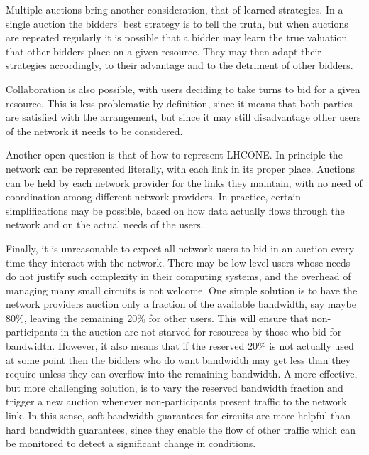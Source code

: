 Multiple auctions bring another consideration, that of learned strategies. In a single auction the bidders' best strategy is to tell the truth, but when auctions are repeated regularly it is possible that a bidder may learn the true valuation that other bidders place on a given resource. They may then adapt their strategies accordingly, to their advantage and to the detriment of other bidders. 

Collaboration is also possible, with users deciding to take turns to bid for a given resource. This is less problematic by definition, since it means that both parties are satisfied with the arrangement, but since it may still disadvantage other users of the network it needs to be considered.

Another open question is that of how to represent LHCONE. In principle the network can be represented literally, with each link in its proper place. Auctions can be held by each network provider for the links they maintain, with no need of coordination among different network providers. In practice, certain simplifications may be possible, based on how data actually flows through the network and on the actual needs of the users.

Finally, it is unreasonable to expect all network users to bid in an auction every time they interact with the network. There may be low-level users whose needs do not justify such complexity in their computing systems, and the overhead of managing many small circuits is not welcome. One simple solution is to have the network providers auction only a fraction of the available bandwidth, say maybe 80\%, leaving the remaining 20\% for other users. This will ensure that non-participants in the auction are not starved for resources by those who bid for bandwidth. However, it also means that if the reserved 20\% is not actually used at some point then the bidders who do want bandwidth may get less than they require unless they can overflow into the remaining bandwidth. A more effective, but more challenging solution, is to vary the reserved bandwidth fraction and trigger a new auction whenever non-participants present traffic to the network link. In this sense, soft bandwidth guarantees for circuits are more helpful than hard bandwidth guarantees, since they enable the flow of other traffic which can be monitored to detect a significant change in conditions.
